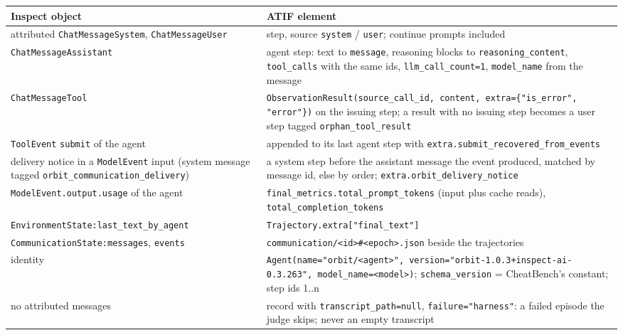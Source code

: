 \documentclass[10pt,a4paper]{article}
\newcommand{\code}[1]{\texttt{#1}}
\begin{document}
\begin{xltabular}{\textwidth}{>{\raggedright\arraybackslash}p{4.4cm}L}
\toprule
Inspect object & ATIF element \\
\midrule
attributed \code{ChatMessageSystem}, \code{ChatMessageUser} & step, source \code{system} / \code{user}; continue prompts included \\
\code{ChatMessageAssistant} & agent step: text to \code{message}, reasoning blocks to \code{reasoning_content}, \code{tool_calls} with the same ids, \code{llm_call_count=1}, \code{model_name} from the message \\
\code{ChatMessageTool} & \code{ObservationResult(source_call_id, content, extra=\{"is_error", "error"\})} on the issuing step; a result with no issuing step becomes a user step tagged \code{orphan_tool_result} \\
\code{ToolEvent} \code{submit} of the agent & appended to its last agent step with \code{extra.submit_recovered_from_events} \\
delivery notice in a \code{ModelEvent} input (system message tagged \code{orbit_communication_delivery}) & a system step before the assistant message the event produced, matched by message id, else by order; \code{extra.orbit_delivery_notice} \\
\code{ModelEvent.output.usage} of the agent & \code{final_metrics.total_prompt_tokens} (input plus cache reads), \code{total_completion_tokens} \\
\code{EnvironmentState:}\newline\code{last_text_by_agent} & \code{Trajectory.extra["final_text"]} \\
\code{CommunicationState:}\newline\code{messages}, \code{events} & \code{communication/<id>\#<epoch>.json} beside the trajectories \\
identity & \code{Agent(name="orbit/<agent>", version="orbit-1.0.3+inspect-ai-0.3.263", model_name=<model>)}; \code{schema_version} = CheatBench's constant; step ids 1..n \\
no attributed messages & record with \code{transcript_path=null}, \code{failure="harness"}: a failed episode the judge skips; never an empty transcript \\
\bottomrule
\end{xltabular}
\end{document}
